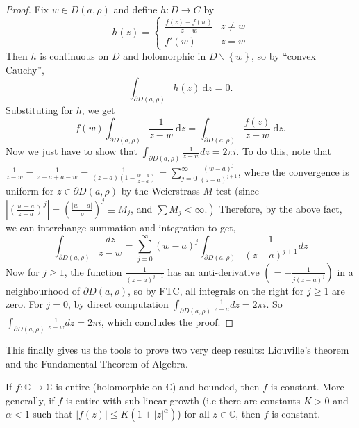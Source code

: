 \documentclass[a4paper]{scrartcl}
\begin{document}
\begin{proof}
     Fix $w \in D (a, \rho)$ and define $h: D \rightarrow C$ by 
     \begin{equation*}
           h (z)=
           \begin{cases}
                \frac{f (z)-f (w)}{z-w}& z \neq w\\
                f' (w) & z=w
           \end{cases}
     \end{equation*}
     Then $h$ is continuous on $D$ and holomorphic in $D \backslash \left\{w\right\}$, so by ``convex Cauchy'', \[
     \int_{ \partial D (a,\rho)}^{}h (z) \ \mathrm{d}z=0 
     .\] Substituting for $h$, we get \[
     f (w) \int_{ \partial D (a,\rho)}^{} \frac{1}{z-w} \ \mathrm{d}z=\int_{ \partial D (a,\rho)}^{} \frac{f (z)}{z-w} \ \mathrm{d}z
     .\] Now we just have to show that $\int_{\partial D(a, \rho)} \frac{1}{z-w} d z=2 \pi i$. To do this, note that $\frac{1}{z-w}=\frac{1}{z-a+a-w}=\frac{1}{(z-a)\left(1-\frac{w-a}{z-a}\right)}=\sum_{j=0}^{\infty} \frac{(w-a)^{j}}{(z-a)^{j+1}}$, where the convergence is uniform for $z \in \partial D(a, \rho)$ by the Weierstrass $M$-test (since $\left|\left(\frac{w-a}{z-a}\right)^{j}\right|=\left(\frac{|w-a|}{\rho}\right)^{j} \equiv M_{j}$, and $\left.\sum M_{j}<\infty .\right)$ Therefore, by the above fact, we can interchange summation and integration to get,
     $$
     \int_{\partial D(a, \rho)} \frac{d z}{z-w}=\sum_{j=0}^{\infty}(w-a)^{j} \int_{\partial D(a, \rho)} \frac{1}{(z-a)^{j+1}} d z
     $$
     Now for $j \geq 1$, the function $\frac{1}{(z-a)^{j+1}}$ has an anti-derivative $\left(=-\frac{1}{j(z-a)^{j}}\right)$ in a neighbourhood of $\partial D(a, \rho)$, so by FTC, all integrals on the right for $j \geq 1$ are zero. For $j=0$, by direct computation $\int_{\partial D(a, \rho)} \frac{1}{z-a} d z=2 \pi i$.
     So $\int_{\partial D(a, \rho)} \frac{1}{z-w} d z=2 \pi i$, which concludes the proof.
\end{proof}
This finally gives us the tools to prove two very deep results: Liouville's theorem and the Fundamental Theorem of Algebra.
\begin{theorem}
      If $f: \mathbb{C} \rightarrow \mathbb{C}$ is entire (holomorphic on $\mathbb{C}$) and bounded, then $f$ is constant. More generally, if $f$ is entire with sub-linear growth (i.e there are constants $K>0$ and $\alpha<1$ such that $\left|f (z)\right|\leq K (1+\left|z\right|^{\alpha})$) for all $z \in \mathbb{C}$, then $f$ is constant. 
\end{theorem}
\end{document}
